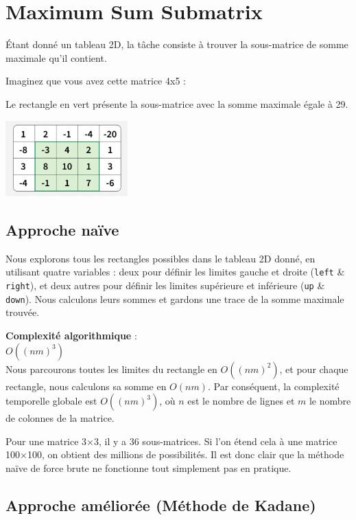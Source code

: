 \documentclass[
]{article}
\begin{document}
\section{Maximum Sum Submatrix}\label{maximum-sum-submatrix}

Étant donné un tableau 2D, la tâche consiste à trouver la sous-matrice
de somme maximale qu'il contient.

Imaginez que vous avez cette matrice 4x5 :

Le rectangle en vert présente la sous-matrice avec la somme maximale
égale à 29.

\includegraphics[width=1.85417in,height=\textheight]{images/G2-01.JPG}

\subsection{Approche naïve}\label{approche-nauxefve}

Nous explorons tous les rectangles possibles dans le tableau 2D donné,
en utilisant quatre variables : deux pour définir les limites gauche et
droite (\texttt{left} \& \texttt{right}), et deux autres pour définir
les limites supérieure et inférieure (\texttt{up} \& \texttt{down}).
Nous calculons leurs sommes et gardons une trace de la somme maximale
trouvée.

\textbf{Complexité algorithmique} :\\
\(O\left((nm)^3\right)\)\\
Nous parcourons toutes les limites du rectangle en \(O((nm)^2)\), et
pour chaque rectangle, nous calculons sa somme en \(O(nm)\). Par
conséquent, la complexité temporelle globale est \(O((nm)^3)\), où \(n\)
est le nombre de lignes et \(m\) le nombre de colonnes de la matrice.

Pour une matrice 3×3, il y a 36 sous-matrices. Si l'on étend cela à une
matrice 100×100, on obtient des millions de possibilités. Il est donc
clair que la méthode naïve de force brute ne fonctionne tout simplement
pas en pratique.

\subsection{Approche améliorée (Méthode de
Kadane)}\label{approche-amuxe9lioruxe9e-muxe9thode-de-kadane}
\end{document}

